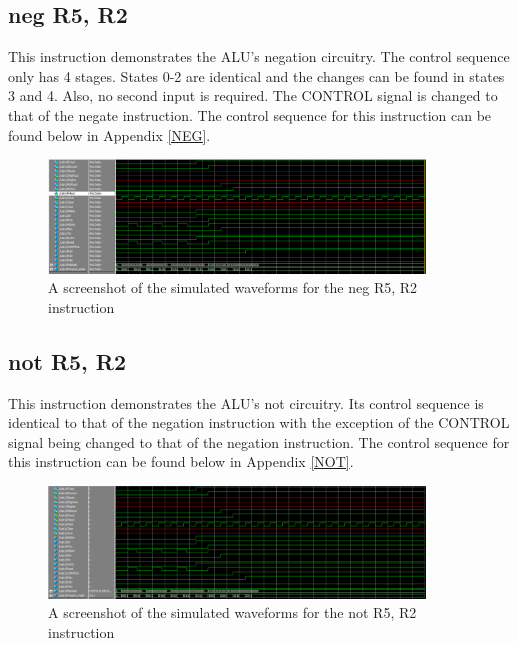 \documentclass{article}
\begin{document}
    \subsection{neg R5, R2}
    This instruction demonstrates the ALU's negation circuitry. The control sequence only has 4 stages. States 0-2 are identical and the changes can be found in states 3 and 4. Also, no second input is required. The CONTROL signal is changed to that of the negate instruction. The control sequence for this instruction can be found below in Appendix \ref{NEG}.

    \begin{figure}[h!]
        \begin{center}
            \includegraphics[width=10cm]{neg}
            \caption{A screenshot of the simulated waveforms for the neg R5, R2 instruction}
        \end{center}
    \end{figure}

    \subsection{not R5, R2}
    This instruction demonstrates the ALU's not circuitry. Its control sequence is identical to that of the negation instruction with the exception of the CONTROL signal being changed to that of the negation instruction. The control sequence for this instruction can be found below in Appendix \ref{NOT}.
    \begin{figure}[h!]
        \begin{center}
            \includegraphics[width=10cm]{not}
            \caption{A screenshot of the simulated waveforms for the not R5, R2 instruction}
        \end{center}
    \end{figure}
\end{document}
